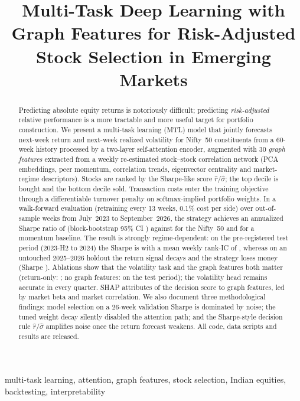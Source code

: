 \documentclass[conference]{IEEEtran}
\title{Multi-Task Deep Learning with Graph Features for Risk-Adjusted Stock Selection in Emerging Markets}
\author{\IEEEauthorblockN{Shlok Shah}
\IEEEauthorblockA{Independent Researcher\\ Email: studentplanchahiye@gmail.com}}
\begin{document}
\maketitle

\begin{abstract}
Predicting absolute equity returns is notoriously difficult; predicting \emph{risk-adjusted} relative performance is a more tractable and more useful target for portfolio construction. We present a multi-task learning (MTL) model that jointly forecasts next-week return and next-week realized volatility for Nifty~50 constituents from a 60-week history processed by a two-layer self-attention encoder, augmented with 30 \emph{graph features} extracted from a weekly re-estimated stock--stock correlation network (PCA embeddings, peer momentum, correlation trends, eigenvector centrality and market-regime descriptors). Stocks are ranked by the Sharpe-like score $\hat{r}/\hat{\sigma}$; the top decile is bought and the bottom decile sold. Transaction costs enter the training objective through a differentiable turnover penalty on softmax-implied portfolio weights. In a walk-forward evaluation (retraining every 13 weeks, 0.1\% cost per side) over \MtlAllWeeks{} out-of-sample weeks from July~2023 to September~2026, the strategy achieves an annualized Sharpe ratio of \MtlAllSharpe{} (block-bootstrap 95\% CI \MtlAllSharpeCi) against \NiftyAllSharpe{} for the Nifty~50 and \MomAllSharpe{} for a momentum baseline. The result is strongly regime-dependent: on the pre-registered test period (2023-H2 to 2024) the Sharpe is \MtlTestSharpe{} with a mean weekly rank-IC of \MtlTestIc, whereas on an untouched 2025--2026 holdout the return signal decays and the strategy loses money (Sharpe \MtlHoldSharpe). Ablations show that the volatility task and the graph features both matter (return-only: \RetOnlyTestSharpe; no graph features: \NoGraphTestSharpe{} on the test period); the volatility head remains accurate in every quarter. SHAP attributes \shapGraphShare{} of the decision score to graph features, led by market beta and market correlation. We also document three methodological findings: model selection on a 26-week validation Sharpe is dominated by noise; the tuned weight decay silently disabled the attention path; and the Sharpe-style decision rule $\hat r/\hat\sigma$ amplifies noise once the return forecast weakens. All code, data scripts and results are released.
\end{abstract}

\begin{IEEEkeywords}
multi-task learning, attention, graph features, stock selection, Indian equities, backtesting, interpretability
\end{IEEEkeywords}
\end{document}
